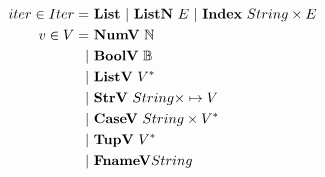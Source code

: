 \begin{align*}
%
  iter \in Iter =& ~ \listiter ~ | ~ \listniter ~ E ~|~ \listidxiter ~ String \times E \\
%
  v \in V =& ~ \numv ~ \mathbb N \\
    | & ~ \boolv ~ \mathbb B \\
    | & ~ \listv ~ \seq V \\
    | & ~ \strv ~ String \times \mapsto V \\
    | & ~ \casev ~ String \times \seq V \\
    | & ~ \tupv ~ \seq V \\
    | & ~ \fnamev String \\
\end{align*}





\newpage

